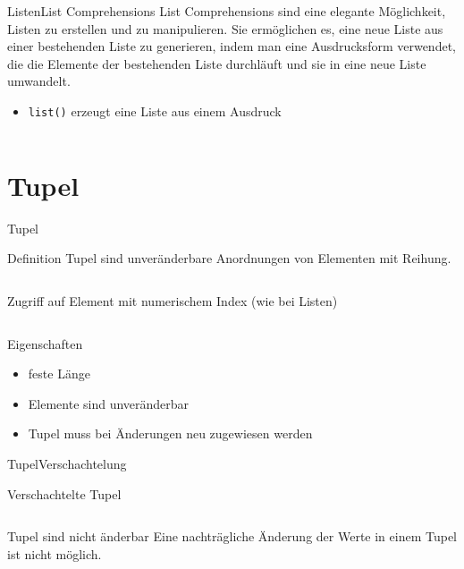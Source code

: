 \documentclass[xelatex,aspectratio=169]{beamer}
\begin{document}
\begin{frame}{Listen}{List Comprehensions}
    List Comprehensions sind eine elegante Möglichkeit, Listen zu erstellen und zu manipulieren. Sie ermöglichen es, eine neue Liste aus einer bestehenden Liste zu generieren, indem man eine Ausdrucksform verwendet, die die Elemente der bestehenden Liste durchläuft und sie in eine neue Liste umwandelt.

    \begin{itemize}
        \item \texttt{list()} erzeugt eine Liste aus einem Ausdruck
    \end{itemize}


    \inputminted[lastline=8]{python}{src/listen_comprehensions.py}
\end{frame}

\section{Tupel}

\begin{frame}{Tupel}
    \begin{block}{Definition}
        Tupel sind unveränderbare Anordnungen von Elementen mit Reihung.
    \end{block}

    \inputminted[lastline=4]{python}{src/tupel_overview.py}

    Zugriff auf Element mit numerischem Index (wie bei Listen)

    \inputminted[firstline=6]{python}{src/tupel_overview.py}

    \begin{block}{Eigenschaften}
        \begin{itemize}
            \item feste Länge
            \item Elemente sind unveränderbar
            \item Tupel muss bei Änderungen neu zugewiesen werden
        \end{itemize}

    \end{block}

\end{frame}

\begin{frame}{Tupel}{Verschachtelung}
    \begin{block}{Verschachtelte Tupel}
        \small
        \inputminted[lastline=5]{python}{src/tupel_nested.py}
    \end{block}
    \vspace{-5pt}
    \begin{alertblock}{Tupel sind nicht änderbar}
        \small
        Eine nachträgliche Änderung der Werte in einem Tupel ist nicht möglich.
        \vspace{-5pt}
        \inputminted[firstline=7]{python}{src/tupel_nested.py}

    \end{alertblock}

\end{frame}
\end{document}
